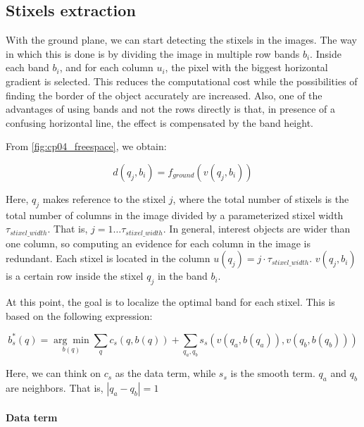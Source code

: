 \subsection{Stixels extraction}\label{ch:chapter04_01_02}

With the ground plane, we can start detecting the stixels in the images. The way in which this is done is by dividing the image in multiple row bands $b_i$. Inside each band $b_i$, and for each column $u_i$, the pixel with the biggest horizontal gradient is selected. This reduces the computational cost while the possibilities of finding the border of the object accurately are increased. Also, one of the advantages of using bands and not the rows directly is that, in presence of a confusing horizontal line, the effect is compensated by the band height.

From \ref{fig:cp04_freespace}, we obtain:

\begin{equation}\label{eq:cp04_ground_plane_function_by_band}
  d(q_j, b_i) = f_{ground}(v(q_j, b_i))
\end{equation}

Here, $q_j$ makes reference to the stixel $j$, where the total number of stixels is the total number of columns in the image divided by a parameterized stixel width $\tau_{stixel\_width}$. That is, $j=1 \dots \tau_{stixel\_width}$. In general, interest objects are wider than one column, so computing an evidence for each column in the image is redundant. Each stixel is located in the column $u(q_j) = j \cdot \tau_{stixel\_width}$. $v(q_j, b_i)$ is a certain row inside the stixel $q_j$ in the band $b_i$. 

At this point, the goal is to localize the optimal band for each stixel. This is based on the following expression:

\begin{equation}\label{eq:cp04_stixel_band_cost}
  b^*_s (q) = \underset{b(q)}{\arg\min} \underset{q}{\sum}c_s(q, b(q)) + \underset{q_a, q_b}{\sum}s_s(v(q_a, b(q_a)), v(q_b, b(q_b)))
\end{equation}

Here, we can think on $c_s$ as the data term, while $s_s$ is the smooth term. $q_a$ and $q_b$ are neighbors. That is, $|q_a - q_b| = 1$

\paragraph{Data term}\label{ch:chapter04_01_02_01}

